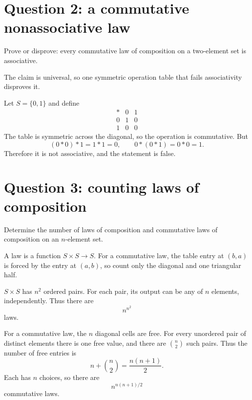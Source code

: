 \documentclass[11pt,openany]{book}
\begin{document}
\section{Question 2: a commutative nonassociative law}
\begin{questionbox}
Prove or disprove: every commutative law of composition on a two-element set is associative.
\end{questionbox}
\begin{approachbox}
The claim is universal, so one symmetric operation table that fails associativity disproves it.
\end{approachbox}
\begin{solutionbox}
Let $S=\{0,1\}$ and define
\[
\begin{array}{c|cc}*&0&1\\\hline
0&1&0\\1&0&0
\end{array}
\]
The table is symmetric across the diagonal, so the operation is commutative. But
\[
(0*0)*1=1*1=0,
\qquad
0*(0*1)=0*0=1.
\]
Therefore it is not associative, and the statement is false.
\end{solutionbox}

\section{Question 3: counting laws of composition}
\begin{questionbox}
Determine the number of laws of composition and commutative laws of composition on an $n$-element set.
\end{questionbox}
\begin{approachbox}
A law is a function $S\times S\to S$. For a commutative law, the table entry at $(b,a)$ is forced by the entry at $(a,b)$, so count only the diagonal and one triangular half.
\end{approachbox}
\begin{solutionbox}
$S\times S$ has $n^2$ ordered pairs. For each pair, its output can be any of $n$ elements, independently. Thus there are
\[
n^{n^2}
\]
laws.

For a commutative law, the $n$ diagonal cells are free. For every unordered pair of distinct elements there is one free value, and there are $\binom n2$ such pairs. Thus the number of free entries is
\[
n+\binom n2=\frac{n(n+1)}2.
\]
Each has $n$ choices, so there are
\[
n^{n(n+1)/2}
\]
commutative laws.
\end{solutionbox}
\end{document}
